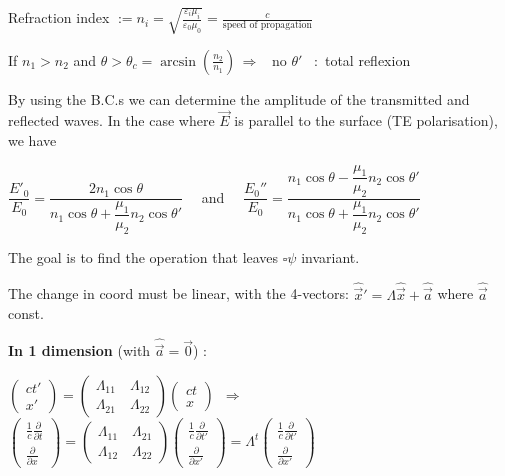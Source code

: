 \item Refraction index $:=n_i=\sqrt{\frac{\varepsilon_i\mu_i}{\varepsilon_0\mu_0}}=\frac{c}{\text{speed of propagation}}$

\item If $n_1 > n_2$ and $\theta > \theta_c = \arcsin\left(\frac{n_2}{n_1}\right) \, \Rightarrow$ \, no $\theta'$ \, :\, total reflexion

\item[] By using the B.C.s we can determine the amplitude of the transmitted and reflected waves. In the case where $\vec{E}$ is parallel to the surface (TE polarisation), we have

\item $\dfrac{E'_0}{E_0} = \dfrac{2n_1\cos\theta}{n_1\cos\theta + \dfrac{\mu_1}{\mu_2}n_2\cos\theta'} \quad $ and $\quad \dfrac{E_0''}{E_0}  = \dfrac{n_1\cos\theta - \dfrac{\mu_1}{\mu_2}n_2\cos\theta'}{n_1\cos\theta + \dfrac{\mu_1}{\mu_2} n_2 \cos\theta'}$
\squishend
{}
\squishlist
\item[] The goal is to find the operation that leaves $\square \psi$ invariant.

\item The change in coord must be linear, with the 4-vectors: $\hat{\vec{x}}' = \Lambda\hat{\vec{x}} + \hat{\vec{a}}$ where $ \hat{\vec{a}}$ const.

\item[] \textbf{In 1 dimension} (with $\hat{\vec{a}} = \vec{0}$) : 
\item $\begin{pmatrix}
					ct'\\
					x'
					\end{pmatrix} =
					\begin{pmatrix}
					\Lambda_{11} \quad \Lambda_{12}\\
					\Lambda_{21} \quad \Lambda_{22}
					\end{pmatrix}
					\begin{pmatrix}
					ct\\
					x
					\end{pmatrix}\, $
			        $\Rightarrow$ 	$\begin{pmatrix}
					\frac{1}{c}\frac{\partial}{\partial t}\\
					\frac{\partial}{\partial x} 
					\end{pmatrix} =
					\begin{pmatrix}
					\Lambda_{11} \quad \Lambda_{21}\\
					\Lambda_{12} \quad \Lambda_{22}
					\end{pmatrix}					
					\begin{pmatrix}
					\frac{1}{c}\frac{\partial}{\partial t'}\\
					\frac{\partial}{\partial x'} 
					\end{pmatrix} =	\Lambda^{t}
					\begin{pmatrix}
					\frac{1}{c}\frac{\partial}{\partial t'}\\
					\frac{\partial}{\partial x'} 
					\end{pmatrix}$\\
					
